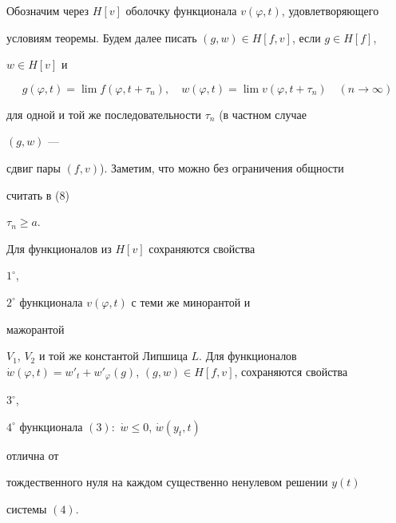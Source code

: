 Обозначим через $H[v]$ оболочку функционала $v(\varphi,t)$, удовлетворяющего


условиям теоремы. Будем далее писать $(g,w)\in H[f,v]$, если $g\in


H[f]$,


$w\in H[v]$ и


\begin{equation}


g(\varphi,t)=\lim f(\varphi,t+\tau_n),\quad


w(\varphi,t)=\lim v(\varphi,t+\tau_n)\quad (n\to\infty)


\end{equation}


для одной и той же последовательности $\tau_n$ (в частном случае


$(g,w)$ ---


сдвиг пары $(f,v)$). Заметим, что можно без ограничения общности


считать в (8)


$\tau_n\geqslant a$.





\begin{lem}


Для функционалов из $H[v]$ сохраняются свойства


$1^{\circ}$,


$2^{\circ}$ функционала $v(\varphi,t)$ с теми же минорантой и


мажорантой


$V_1$, $V_2$ и той же константой Липшица $L$. Для функционалов $\Dot


w(\varphi,t)=w'_t+w'_{\varphi}(g)$, $(g,w)\in H[f,v]$, сохраняются свойства


$3^{\circ}$,


$4^{\circ}$ функционала $(3):$ $\Dot w\leqslant 0$, $\Dot w(y_t,t)$


отлична от


тождественного нуля на каждом существенно ненулевом решении $y(t)$


системы $(4)$.


\end{lem}





